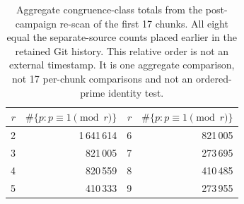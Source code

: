 \begin{table}[ht]
\centering\small
\begin{tabular}{r r r r}
\toprule
$r$ & $\#\{p:p\equiv1\pmod r\}$ & $r$ & $\#\{p:p\equiv1\pmod r\}$ \\
\midrule
2 & 1\,641\,614 & 6 & 821\,005 \\
3 & 821\,005 & 7 & 273\,695 \\
4 & 820\,559 & 8 & 410\,485 \\
5 & 410\,333 & 9 & 273\,955 \\
\bottomrule
\end{tabular}
\caption{Aggregate congruence-class totals from the post-campaign re-scan of
the first 17 chunks. All eight equal the separate-source counts placed earlier in
the retained Git history. This relative order is not an external timestamp. It is one
aggregate comparison, not 17 per-chunk
comparisons and not an ordered-prime identity test.}
\label{tab:rescan17}
\end{table}
